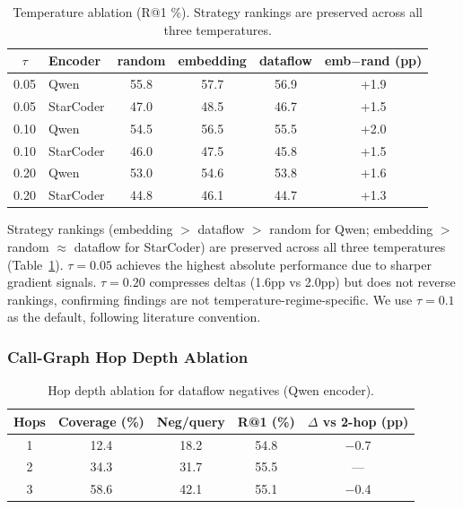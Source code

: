 \documentclass[11pt]{article}
\begin{document}
\begin{table}[h]
\centering
\caption{Temperature ablation (R@1 \%). Strategy rankings are preserved across all three temperatures.}
\label{tab:temperature}
\begin{tabular}{clcccc}
\toprule
$\tau$ & \textbf{Encoder} & \textbf{random} & \textbf{embedding} & \textbf{dataflow} & \textbf{emb$-$rand (pp)} \\
\midrule
0.05 & Qwen & 55.8 & 57.7 & 56.9 & +1.9 \\
0.05 & StarCoder & 47.0 & 48.5 & 46.7 & +1.5 \\
0.10 & Qwen & 54.5 & 56.5 & 55.5 & +2.0 \\
0.10 & StarCoder & 46.0 & 47.5 & 45.8 & +1.5 \\
0.20 & Qwen & 53.0 & 54.6 & 53.8 & +1.6 \\
0.20 & StarCoder & 44.8 & 46.1 & 44.7 & +1.3 \\
\bottomrule
\end{tabular}
\end{table}

Strategy rankings (embedding $>$ dataflow $>$ random for Qwen; embedding $>$ random $\approx$ dataflow for StarCoder) are preserved across all three temperatures (Table~\ref{tab:temperature}).
$\tau = 0.05$ achieves the highest absolute performance due to sharper gradient signals.
$\tau = 0.20$ compresses deltas (1.6pp vs 2.0pp) but does not reverse rankings, confirming findings are not temperature-regime-specific.
We use $\tau = 0.1$ as the default, following literature convention.

\subsubsection{Call-Graph Hop Depth Ablation}
\label{sec:hop_ablation}

\begin{table}[h]
\centering
\caption{Hop depth ablation for dataflow negatives (Qwen encoder).}
\label{tab:hop_depth}
\begin{tabular}{ccccc}
\toprule
\textbf{Hops} & \textbf{Coverage (\%)} & \textbf{Neg/query} & \textbf{R@1 (\%)} & \textbf{$\Delta$ vs 2-hop (pp)} \\
\midrule
1 & 12.4 & 18.2 & 54.8 & $-$0.7 \\
2 & 34.3 & 31.7 & 55.5 & --- \\
3 & 58.6 & 42.1 & 55.1 & $-$0.4 \\
\bottomrule
\end{tabular}
\end{table}
\end{document}
